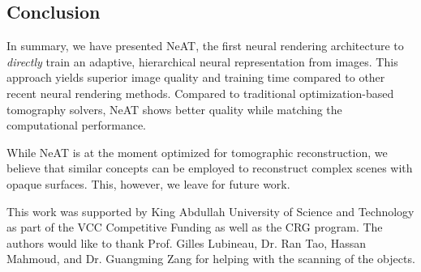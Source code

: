 \documentclass[acmtog,nonacm]{acmart} \acmSubmissionID{0438}
\newcommand{\neat}{NeAT\xspace}
\begin{document}
\subsection{Conclusion}

In summary, we have presented \neat, the first neural rendering
architecture to {\em directly} train an adaptive, hierarchical neural
representation from images. This approach yields superior image
quality and training time compared to other recent neural rendering
methods. Compared to traditional optimization-based tomography
solvers, \neat shows better quality while matching the computational
performance.

While \neat is at the moment optimized for tomographic reconstruction,
we believe that similar concepts can be employed to reconstruct
complex scenes with opaque surfaces. This, however, we leave for
future work.

 

\begin{acks}


This work was supported by King Abdullah University of Science and
Technology as part of the VCC Competitive Funding as well as the CRG
program. The authors would like to thank Prof. Gilles Lubineau,
Dr. Ran Tao, Hassan Mahmoud, and Dr. Guangming Zang for helping with
the scanning of the objects.  
 

\end{acks}



\end{document}
